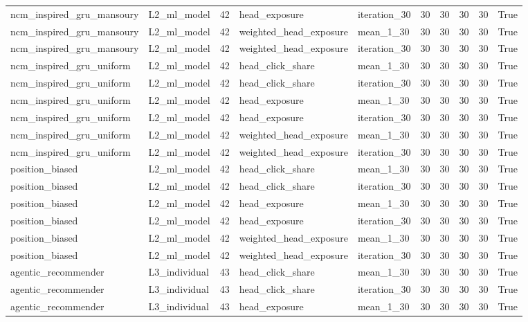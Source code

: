 \begin{table}[htbp!]
\begin{tabular}{llrllrrrrr}
ncm\_inspired\_gru\_mansoury & L2\_ml\_model & 42 & head\_exposure & iteration\_30 & 30 & 30 & 30 & 30 & True \\
ncm\_inspired\_gru\_mansoury & L2\_ml\_model & 42 & weighted\_head\_exposure & mean\_1\_30 & 30 & 30 & 30 & 30 & True \\
ncm\_inspired\_gru\_mansoury & L2\_ml\_model & 42 & weighted\_head\_exposure & iteration\_30 & 30 & 30 & 30 & 30 & True \\
ncm\_inspired\_gru\_uniform & L2\_ml\_model & 42 & head\_click\_share & mean\_1\_30 & 30 & 30 & 30 & 30 & True \\
ncm\_inspired\_gru\_uniform & L2\_ml\_model & 42 & head\_click\_share & iteration\_30 & 30 & 30 & 30 & 30 & True \\
ncm\_inspired\_gru\_uniform & L2\_ml\_model & 42 & head\_exposure & mean\_1\_30 & 30 & 30 & 30 & 30 & True \\
ncm\_inspired\_gru\_uniform & L2\_ml\_model & 42 & head\_exposure & iteration\_30 & 30 & 30 & 30 & 30 & True \\
ncm\_inspired\_gru\_uniform & L2\_ml\_model & 42 & weighted\_head\_exposure & mean\_1\_30 & 30 & 30 & 30 & 30 & True \\
ncm\_inspired\_gru\_uniform & L2\_ml\_model & 42 & weighted\_head\_exposure & iteration\_30 & 30 & 30 & 30 & 30 & True \\
position\_biased & L2\_ml\_model & 42 & head\_click\_share & mean\_1\_30 & 30 & 30 & 30 & 30 & True \\
position\_biased & L2\_ml\_model & 42 & head\_click\_share & iteration\_30 & 30 & 30 & 30 & 30 & True \\
position\_biased & L2\_ml\_model & 42 & head\_exposure & mean\_1\_30 & 30 & 30 & 30 & 30 & True \\
position\_biased & L2\_ml\_model & 42 & head\_exposure & iteration\_30 & 30 & 30 & 30 & 30 & True \\
position\_biased & L2\_ml\_model & 42 & weighted\_head\_exposure & mean\_1\_30 & 30 & 30 & 30 & 30 & True \\
position\_biased & L2\_ml\_model & 42 & weighted\_head\_exposure & iteration\_30 & 30 & 30 & 30 & 30 & True \\
agentic\_recommender & L3\_individual & 43 & head\_click\_share & mean\_1\_30 & 30 & 30 & 30 & 30 & True \\
agentic\_recommender & L3\_individual & 43 & head\_click\_share & iteration\_30 & 30 & 30 & 30 & 30 & True \\
agentic\_recommender & L3\_individual & 43 & head\_exposure & mean\_1\_30 & 30 & 30 & 30 & 30 & True \\

\end{tabular}
\end{table}
